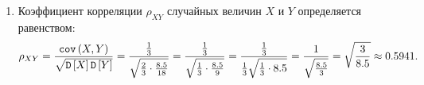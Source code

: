 \begin{enumerate}
    \item Коэффициент корреляции $\rho_{XY}$ случайных величин $X$ и $Y$ определяется равенством:
    \begin{equation}
        \rho_{XY}
        = \frac{\texttt{cov} \left ( X , Y \right )}{\sqrt{\mathtt{D} \left [ X \right ] \mathtt{D} \left [ Y \right ]}}
        = \frac{\frac{1}{3}}{\sqrt{\frac{2}{3} \cdot \frac{8.5}{18}}}
        = \frac{\frac{1}{3}}{\sqrt{\frac{1}{3} \cdot \frac{8.5}{9}}}
        = \frac{\frac{1}{3}}{\frac{1}{3} \sqrt{\frac{1}{3} \cdot 8.5}}
        = \frac{1}{\sqrt{\frac{8.5}{3}}}
        = \sqrt{\frac{3}{8.5}}
        \approx 0.5941
        .
    \end{equation}

%
%
%

\end{enumerate}
